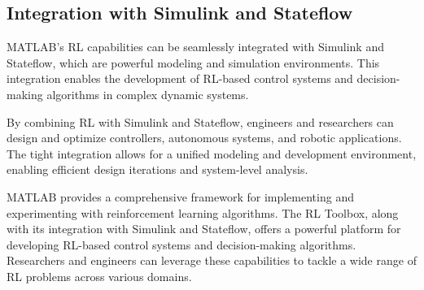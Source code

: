 \documentclass{article}
\begin{document}
\subsection{Integration with Simulink and Stateflow}

MATLAB's RL capabilities can be seamlessly integrated with Simulink and Stateflow, which are powerful modeling and simulation environments. This integration enables the development of RL-based control systems and decision-making algorithms in complex dynamic systems.

By combining RL with Simulink and Stateflow, engineers and researchers can design and optimize controllers, autonomous systems, and robotic applications. The tight integration allows for a unified modeling and development environment, enabling efficient design iterations and system-level analysis.

MATLAB provides a comprehensive framework for implementing and experimenting with reinforcement learning algorithms. The RL Toolbox, along with its integration with Simulink and Stateflow, offers a powerful platform for developing RL-based control systems and decision-making algorithms. Researchers and engineers can leverage these capabilities to tackle a wide range of RL problems across various domains.
\end{document}
